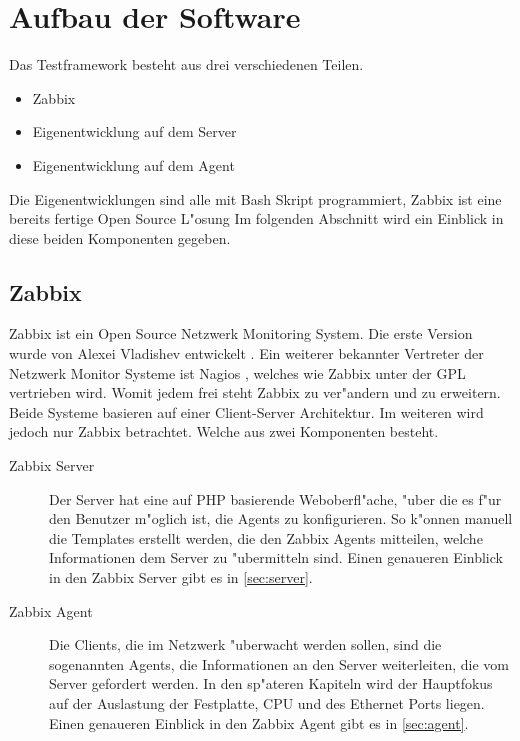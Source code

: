 \section{Aufbau der Software} \label{sec:aufbauSoftware}
Das Testframework besteht aus drei verschiedenen Teilen. %
\begin{itemize}
\item Zabbix %
\item Eigenentwicklung auf dem Server %
\item Eigenentwicklung auf dem Agent %
\end{itemize}
Die Eigenentwicklungen sind alle mit Bash Skript programmiert, Zabbix ist eine bereits fertige Open Source L"osung %
Im folgenden Abschnitt wird ein Einblick in diese beiden Komponenten gegeben. %

\subsection{Zabbix}
Zabbix ist ein Open Source Netzwerk Monitoring System. Die erste Version wurde von \mbox{Alexei} Vladishev entwickelt \autocite{zabbix:Web}. %
Ein weiterer bekannter Vertreter der Netzwerk Monitor Systeme ist Nagios \autocite{wiki:Nagios}, welches wie Zabbix unter der GPL vertrieben %
wird. Womit jedem frei steht Zabbix zu ver"andern und zu erweitern.  %
Beide Systeme basieren auf einer Client-Server Architektur. Im weiteren wird jedoch nur Zabbix betrachtet. %
Welche aus zwei Komponenten besteht. %

\begin{description}
\item[Zabbix Server]Der Server hat eine auf PHP basierende Weboberfl"ache, "uber die es f"ur den Benutzer m"oglich ist, die Agents zu %
konfigurieren. So k"onnen manuell die Templates erstellt werden, die den Zabbix Agents mitteilen, welche Informationen dem %
Server zu "ubermitteln sind. Einen genaueren Einblick in den Zabbix Server gibt es in \cref{sec:server}. %
\item[Zabbix Agent]Die Clients, die im Netzwerk "uberwacht werden sollen, sind die sogenannten Agents, die  %
Informationen an den Server weiterleiten, die vom Server gefordert werden. In den sp"ateren Kapiteln wird der Hauptfokus auf der %
Auslastung der Festplatte, CPU und des Ethernet Ports liegen. %
Einen genaueren Einblick in den Zabbix Agent gibt es in \cref{sec:agent}. %
\end{description} 

